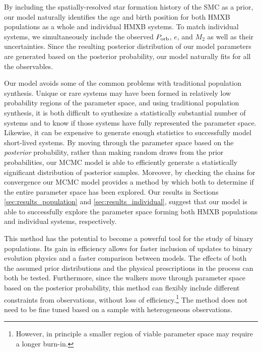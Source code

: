 \documentclass[12pt, preprint]{aastex}
\begin{document}
By including the spatially-resolved star formation history of the SMC as a prior, our model naturally identifies the age and birth position for both HMXB populations as a whole and individual HMXB systems. To match individual systems, we simultaneously include the observed $P_{\rm orb}$, $e$, and $M_2$ as well as their uncertainties. Since the resulting posterior distribution of our model parameters are generated based on the posterior probability, our model naturally fits for all the observables. 

Our model avoids some of the common problems with traditional population synthesis. Unique or rare systems may have been formed in relatively low probability regions of the parameter space, and using traditional population synthesis, it is both difficult to synthesize a statistically substantial number of systems and to know if those systems have fully represented the parameter space. Likewise, it can be expensive to generate enough statistics to successfully model short-lived systems. By moving through the parameter space based on the {\it posterior} probability, rather than making random draws from the prior probabilities, our MCMC model is able to efficiently generate a statistically significant distribution of posterior samples. Moreover, by checking the chains for convergence our MCMC model provides a method by which both to determine if the entire parameter space has been explored. Our results in Sections \ref{sec:results_population} and \ref{sec:results_individual}, suggest that our model is able to successfully explore the parameter space forming both HMXB populations and individual systems, respectively.

This method has the potential to become a powerful tool for the study of binary populations. Its gain in efficiency allows for faster inclusion of updates to binary evolution physics and a faster comparison between models. The effects of both the assumed prior distributions and the physical prescriptions in the process can both be tested. Furthermore, since the walkers move through parameter space based on the posterior probability, this method can flexibly include different constraints from observations, without loss of efficiency.\footnote{However, in principle a smaller region of viable parameter space may require a longer burn-in.} The method does not need to be fine tuned based on a sample with heterogeneous observations.
\end{document}
